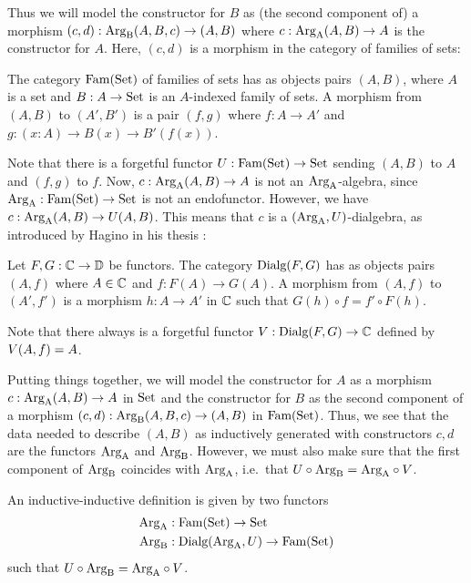 \documentclass[orivec,envcountsame, ,envcountsect]{llncs}
\begin{document}
Thus we will model the constructor for $B$ as (the second component
of) a morphism $(c, d) : \text{Arg}_{\text{B}}(A, B, c) \to (A, B)$ where $c :
\text{Arg}_{\text{A}}(A, B) \to A$ is the constructor for $A$. Here, $(c, d)$ is a
morphism in the category of families of sets:

\begin{definition}
  The category $\text{Fam}(\text{Set})$ of families of sets has as objects pairs $(A,
  B)$, where $A$ is a set and $B : A \to \text{Set}$ is an $A$-indexed family
  of sets. A morphism from $(A, B)$ to $(A', B')$ is a pair $(f, g)$
  where $f : A \to A'$ and ${g : (x : A) \to B(x) \to B'(f(x))}$.
\end{definition}
Note that there is a forgetful functor $U : \text{Fam}(\text{Set}) \to \text{Set}$
sending $(A, B)$ to $A$ and $(f, g)$ to $f$.
Now, $c : \text{Arg}_{\text{A}}(A, B) \to A$ is not an $\text{Arg}_{\text{A}}$-algebra,
since $\text{Arg}_{\text{A}} : \text{Fam}(\text{Set}) \to \text{Set}$ is not an endofunctor. However, we have $c :
\text{Arg}_{\text{A}}(A, B) \to U(A, B)$. This means that $c$ is a $(\text{Arg}_{\text{A}},
U)$-dialgebra, as introduced by Hagino in his thesis
\cite{hagino1987phdthesis}:

\begin{definition}
  Let $F, G : \mathbb{C} \to \mathbb{D}$ be functors. The category $\text{Dialg}(F, G)$ has
  as objects pairs $(A, f)$ where $A \in \mathbb{C}$ and $f : F(A) \to
  G(A)$. A morphism from $(A, f)$ to $(A', f')$ is a morphism $h : A
  \to A'$ in $\mathbb{C}$ such that $G(h) \circ f = f' \circ F(h)$.
\end{definition}
Note that there always is a forgetful functor $V : \text{Dialg}(F, G) \to \mathbb{C}$
defined by $V(A, f) = A$.

Putting things together, we will model the constructor for $A$ as a
morphism $c : \text{Arg}_{\text{A}}(A, B) \to A$ in $\text{Set}$ and the constructor for $B$
as the second component of a morphism $(c, d) : \text{Arg}_{\text{B}}(A, B, c) \to (A,
B)$ in $\text{Fam}(\text{Set})$. Thus, we see that the data needed to describe $(A,
B)$ as inductively generated with constructors $c, d$ are
the functors $\text{Arg}_{\text{A}}$ and $\text{Arg}_{\text{B}}$. However, we must also make sure that
the first component of $\text{Arg}_{\text{B}}$ coincides with $\text{Arg}_{\text{A}}$, i.e.\ that
$U \circ \text{Arg}_{\text{B}} = \text{Arg}_{\text{A}} \circ V$. %
\begin{definition} \label{def:indind-functors}
  An inductive-inductive definition is given by two functors
  \begin{align*}
    \text{Arg}_{\text{A}} &: \text{Fam}(\text{Set}) \to \text{Set} \\
    \text{Arg}_{\text{B}} &: \text{Dialg}(\text{Arg}_{\text{A}}, U) \to \text{Fam}(\text{Set})
  \end{align*}
  such that $U \circ \text{Arg}_{\text{B}} = \text{Arg}_{\text{A}} \circ V$.
\end{definition}
\end{document}
